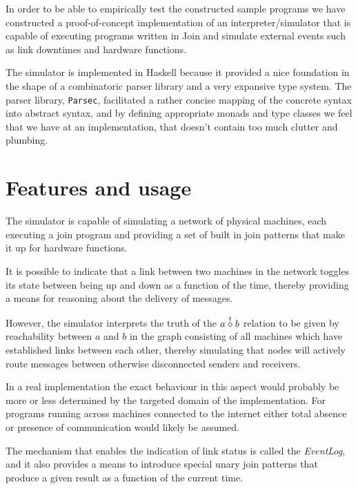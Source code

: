 

In order to be able to empirically test the constructed sample programs we have
constructed a proof-of-concept implementation of an interpreter/simulator that
is capable of executing programs written in Join and simulate external events
such as link downtimes and hardware functions.

The simulator is implemented in Haskell because it provided a nice foundation in
the shape of a combinatoric parser library and a very expansive type system. The
parser library, \texttt{Parsec}, facilitated a rather concise mapping of the
concrete syntax into abstract syntax, and by defining appropriate monads and
type classes we feel that we have at an implementation, that doesn't contain too
much clutter and plumbing.

\section*{Features and usage}
The simulator is capable of simulating a network of physical machines, each
executing a join program and providing a set of built in join patterns that make
it up for hardware functions.

It is possible to indicate that a link between two machines in the network
toggles its state between being up and down as a function of the time, thereby providing a means for reasoning about the delivery of messages.

However, the simulator interprets the truth of the $a \stackrel{t}{\diamond} b$ relation to be
given by reachability between $a$ and $b$ in the graph consisting of all
machines which have established links between each other, thereby simulating
that nodes will actively route messages between otherwise disconnected senders
and receivers.

In a real implementation the exact behaviour in this aspect would probably be
more or less determined by the targeted domain of the implementation. For
programs running across machines connected to the internet either total absence
or presence of communication would likely be assumed.

The mechanism that enables the indication of link status is called the
\emph{EventLog}, and it also provides a means to introduce special unary join
patterns that produce a given result as a function of the current time.

